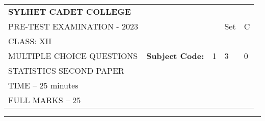 \documentclass{exam}
\begin{document}
\begin{table}[h]
\centering
\begin{tabular}{lllll}
\textbf{\large SYLHET CADET COLLEGE} &  &  &  &  \\ \cline{4-5} 
PRE-TEST EXAMINATION - 2023 &  & \multicolumn{1}{l|}{} & \multicolumn{1}{l|}{Set} & \multicolumn{1}{l|}{C} \\ \cline{4-5} 
CLASS: XII &  &  &  &  \\ \cline{3-5} 
MULTIPLE CHOICE QUESTIONS & \multicolumn{1}{l|}{\textbf{Subject Code:}} & \multicolumn{1}{l|}{1} & \multicolumn{1}{l|}{3} & \multicolumn{1}{l|}{0} \\ \cline{3-5} 
STATISTICS SECOND PAPER &  &  &  &  \\
TIME – 25 minutes &  &  &  &  \\
FULL MARKS – 25 &  &  &  & 
\end{tabular}
\end{table}
\hrule
\end{document}
